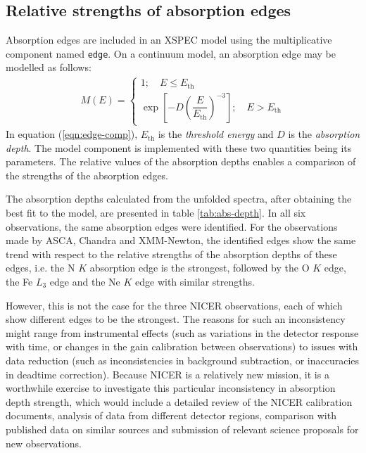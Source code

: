     \subsection{Relative strengths of absorption edges}
    Absorption edges are included in an XSPEC model using the multiplicative component named \texttt{edge}. On a continuum model, an absorption edge may be modelled as follows:
    \begin{align}
    	M(E)=\begin{cases}
    		{1;\quad E\leqslant E_\text{th}} \\
    		{\exp{\left[ -D\left(\dfrac{E}{E_\text{th}}\right)^{-3} \right]};\quad E> E_\text{th}}
    	\end{cases} \label{eqn:edge-comp}
    \end{align}
    In equation (\ref{eqn:edge-comp}), $E_\text{th}$ is the \textit{threshold energy} and $D$ is the \textit{absorption depth}. The model component is implemented with these two quantities being its parameters. The relative values of the absorption depths enables a comparison of the strengths of the absorption edges.
    
    The absorption depths calculated from the unfolded spectra, after obtaining the best fit to the model, are presented in table \ref{tab:abs-depth}. In all six observations, the same absorption edges were identified. For the observations made by ASCA, Chandra and XMM-Newton, the identified edges show the same trend with respect to the relative strengths of the absorption depths of these edges, i.e. the N $K$ absorption edge is the strongest, followed by the O $K$ edge, the Fe $L_3$ edge and the Ne $K$ edge with similar strengths.
    
    However, this is not the case for the three NICER observations, each of which show different edges to be the strongest. The reasons for such an inconsistency might range from instrumental effects (such as variations in the detector response with time, or changes in the gain calibration between observations) to issues with data reduction (such as inconsistencies in background subtraction, or inaccuracies in deadtime correction). Because NICER is a relatively new mission, it is a worthwhile exercise to investigate this particular inconsistency in absorption depth strength, which would include a detailed review of the NICER calibration documents, analysis of data from different detector regions, comparison with published data on similar sources and submission of relevant science proposals for new observations.